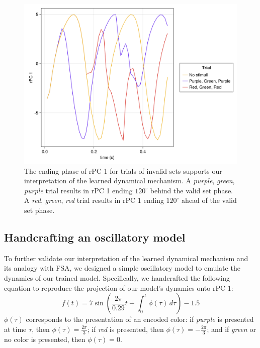 \documentclass[conference]{IEEEtran}
\begin{document}
\begin{figure}[htbp]
\centerline{\includegraphics[scale=0.10]{rotated_pc1_rejected.png}}
\caption{The ending phase of rPC 1 for trials of invalid sets supports our interpretation of the learned dynamical mechanism. A \textit{purple}, \textit{green}, \textit{purple} trial results in rPC 1 ending $120^{\circ}$ behind the valid set phase. A \textit{red}, \textit{green}, \textit{red} trial results in rPC 1 ending $120^{\circ}$ ahead of the valid set phase.}
\label{pcarejectedsets}
\end{figure}

\subsection{Handcrafting an oscillatory model}

To further validate our interpretation of the learned dynamical mechanism and its analogy with FSA, we designed a simple oscillatory model to emulate the dynamics of our trained model. Specifically, we handcrafted the following equation to reproduce the projection of our model's dynamics onto rPC 1:
\begin{equation}
f(t) = 7\sin (\frac{2\pi}{0.29}t+\int_{0}^{t}\phi(\tau)\,d\tau)-1.5\label{simpmodel}
\end{equation}
$\phi(\tau)$ corresponds to the presentation of an encoded color: if \textit{purple} is presented at time $\tau$, then $\phi(\tau)=\frac{2\pi}{3}$; if \textit{red} is presented, then $\phi(\tau)=-\frac{2\pi}{3}$; and if \textit{green} or no color is presented, then $\phi(\tau)=0$.
\end{document}
